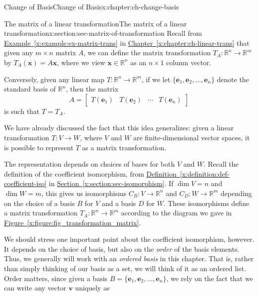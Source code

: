 \documentclass[oneside,10pt,]{book}
\newcommand{\xreffont}{\relax}
\numberwithin{equation}{section}
\newcommand{\bbm}{\begin{bmatrix}}
\newcommand{\ebm}{\end{bmatrix}}
\newcommand{\R}{\mathbb{R}}
\newcommand{\vv}{\mathbf{v}}
\newcommand{\xx}{\mathbf{x}}
\newcommand{\basis}[2]{\{\mathbf{#1}_1,\mathbf{#1}_2,\ldots,\mathbf{#1}_{#2}\}}
\newcommand{\amp}{&}
\begin{document}
%
\begin{chapterptx}{Change of Basis}{}{Change of Basis}{}{}{x:chapter:ch-change-basis}
%
%
\typeout{************************************************}
\typeout{************************************************}
%
\begin{sectionptx}{The matrix of a linear transformation}{}{The matrix of a linear transformation}{}{}{x:section:sec-matrix-of-transformation}
Recall from \hyperref[x:example:ex-matrix-trans]{Example~{\xreffont\ref{x:example:ex-matrix-trans}}} in \hyperref[x:chapter:ch-linear-trans]{Chapter~{\xreffont\ref{x:chapter:ch-linear-trans}}} that given any \(m\times n\) matrix \(A\), we can define the matrix transformation \(T_A:\R^n\to \R^m\) by \(T_A(\xx)=A\xx\), where we view \(\xx\in\R^n\) as an \(n\times 1\) column vector.%
\par
Conversely, given any linear map \(T:\R^n\to \R^m\), if we let \(\basis{e}{n}\) denote the standard basis of \(\R^n\), then the matrix%
\begin{equation*}
A = \bbm T(\mathbf{e}_1) \amp T(\mathbf{e}_2) \amp \cdots \amp T(\mathbf{e}_n)\ebm
\end{equation*}
is such that \(T=T_A\).%
\par
We have already discussed the fact that this idea generalizes: given a linear transformation \(T:V\to W\), where \(V\) and \(W\) are finite-dimensional vector spaces, it is possible to represent \(T\) as a matrix transformation.%
\par
The representation depends on choices of bases for both \(V\) and \(W\). Recall the definition of the coefficient isomorphism, from \hyperref[x:definition:def-coefficient-iso]{Definition~{\xreffont\ref{x:definition:def-coefficient-iso}}} in \hyperref[x:section:sec-isomorphism]{Section~{\xreffont\ref{x:section:sec-isomorphism}}}. If \(\dim V=n\) and \(\dim W=m\), this gives us isomorphisms \(C_B:V\to \R^n\) and \(C_D:W\to \R^m\) depending on the choice of a basis \(B\) for \(V\) and a basis \(D\) for \(W\). These isomorphisms define a matrix transformation \(T_A:\R^n\to \R^m\) according to the diagram we gave in \hyperref[x:figure:fig_transformation_matrix]{Figure~{\xreffont\ref{x:figure:fig_transformation_matrix}}}.%
\par
We should stress one important point about the coefficient isomorphism, however. It depends on the choice of basis, but also on the \emph{order} of the basis elements. Thus, we generally will work with an \emph{ordered basis} in this chapter. That is, rather than simply thinking of our basis as a set, we will think of it as an ordered list. Order matters, since given a basis \(B=\basis{e}{n}\), we rely on the fact that we can write any vector \(\vv\) uniquely as%

\end{sectionptx}
\end{chapterptx}
\end{document}
